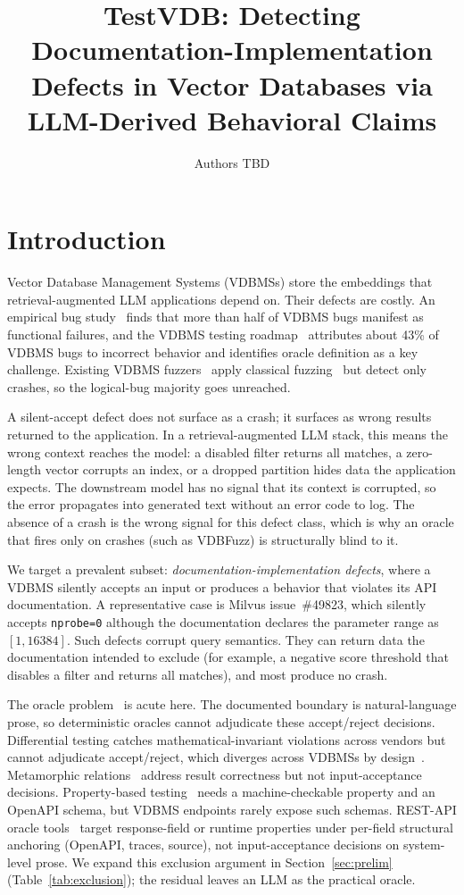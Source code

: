 \documentclass[sigconf]{acmart}
\title[TestVDB: doc-implementation defects in VDBMSs]{TestVDB: Detecting Documentation-Implementation Defects in Vector Databases via LLM-Derived Behavioral Claims}
\author{Authors TBD}
\affiliation{\institution{TBD (anonymity depends on venue)}\country{TBD}}
\begin{document}
\maketitle

\section{Introduction}
\label{sec:intro}

Vector Database Management Systems (VDBMSs) store the embeddings that retrieval-augmented LLM applications depend on. Their defects are costly. An empirical bug study~\cite{bugstudy25} finds that more than half of VDBMS bugs manifest as functional failures, and the VDBMS testing roadmap~\cite{roadmap25} attributes about 43\% of VDBMS bugs to incorrect behavior and identifies oracle definition as a key challenge. Existing VDBMS fuzzers~\cite{vdbfuzz26} apply classical fuzzing~\cite{manes21} but detect only crashes, so the logical-bug majority goes unreached.

A silent-accept defect does not surface as a crash; it surfaces as wrong results returned to the application. In a retrieval-augmented LLM stack, this means the wrong context reaches the model: a disabled filter returns all matches, a zero-length vector corrupts an index, or a dropped partition hides data the application expects. The downstream model has no signal that its context is corrupted, so the error propagates into generated text without an error code to log. The absence of a crash is the wrong signal for this defect class, which is why an oracle that fires only on crashes (such as VDBFuzz) is structurally blind to it.

We target a prevalent subset: \emph{documentation-implementation defects}, where a VDBMS silently accepts an input or produces a behavior that violates its API documentation. A representative case is Milvus issue~\#49823, which silently accepts \texttt{nprobe=0} although the documentation declares the parameter range as $[1, 16384]$. Such defects corrupt query semantics. They can return data the documentation intended to exclude (for example, a negative score threshold that disables a filter and returns all matches), and most produce no crash.

The oracle problem~\cite{barr15} is acute here. The documented boundary is natural-language prose, so deterministic oracles cannot adjudicate these accept/reject decisions. Differential testing catches mathematical-invariant violations across vendors but cannot adjudicate accept/reject, which diverges across VDBMSs by design~\cite{roadmap25}. Metamorphic relations~\cite{metmap24} address result correctness but not input-acceptance decisions. Property-based testing~\cite{claessen00} needs a machine-checkable property and an OpenAPI schema, but VDBMS endpoints rarely expose such schemas. REST-API oracle tools~\cite{agoraplus25,satori25,mastor26} target response-field or runtime properties under per-field structural anchoring (OpenAPI, traces, source), not input-acceptance decisions on system-level prose. We expand this exclusion argument in Section~\ref{sec:prelim} (Table~\ref{tab:exclusion}); the residual leaves an LLM as the practical oracle.
\end{document}
